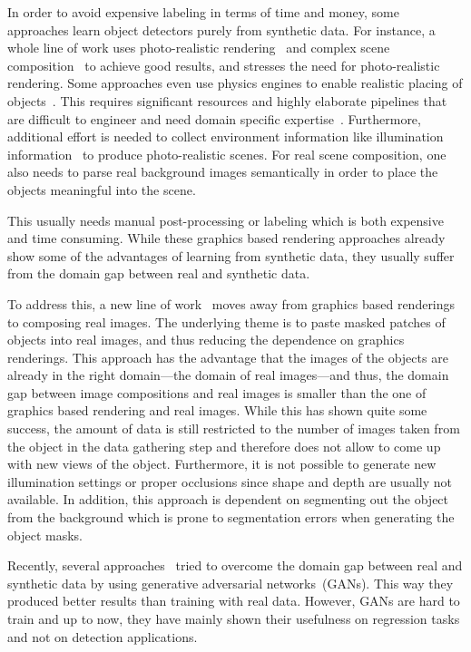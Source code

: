 \documentclass[10pt,twocolumn,letterpaper]{article}
\begin{document}
In order to avoid expensive labeling in terms of time and money, some approaches
learn object detectors purely from synthetic data.  For instance, a whole line of
work uses  photo-realistic rendering~\cite{Alhaija17,Gupta16} and  complex scene
composition~\cite{Gupta16, Alhaija17, Georgakis17, Varol17}  to achieve
good   results,   and   \cite{MovshovitzAttias16}    stresses   the   need   for
photo-realistic rendering.  Some  approaches even use physics  engines to enable
realistic  placing   of  objects~\cite{Mitash17}.   This   requires  significant
resources and highly elaborate pipelines that are difficult to engineer and need
domain  specific  expertise~\cite{Richter_2016_ECCV}.   Furthermore,  additional
effort  is   needed  to   collect  environment  information   like  illumination
information~\cite{Alhaija17} to produce photo-realistic  scenes.  For real scene
composition,  one also  needs to  parse real  background images  semantically in
order to place the objects meaningful into the scene.


This usually  needs manual post-processing  or labeling which is  both expensive
and time  consuming.  While  these graphics  based rendering  approaches already
show some of the advantages of learning from synthetic data, they usually suffer
from the domain gap between real and synthetic data.


To address  this, a  new line of  work~\cite{Dwibedi17,Georgakis17,Rad17c} moves
away from  graphics based renderings  to composing real images.   The underlying
theme is to paste masked patches of  objects into real images, and thus reducing
the dependence on graphics renderings.  This approach has the advantage that the
images  of the  objects are  already in  the right  domain---the domain  of real
images---and thus, the domain gap between  image compositions and real images is
smaller than  the one of graphics  based rendering and real  images.  While this
has shown  quite some  success, the amount  of data is  still restricted  to the
number of images taken from the object  in the data gathering step and therefore
does not allow to come up with new  views of the object.  Furthermore, it is not
possible to generate new illumination  settings or proper occlusions since shape
and depth are usually not available.  In addition, this approach is dependent on
segmenting out  the object from  the background  which is prone  to segmentation
errors when generating the object masks.


Recently, several approaches~\cite{Shrivastava16,Bousmalis17}  tried to overcome
the domain gap  between real and synthetic data by  using generative adversarial
networks~(GANs).  This way they produced  better results than training with real
data.  However, GANs  are hard to train  and up to now, they  have mainly shown
their usefulness on regression tasks and not on detection applications.
\end{document}
